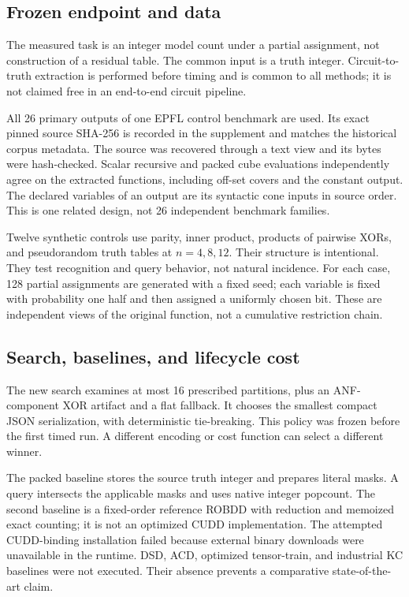 \documentclass[11pt]{article}
\theoremstyle{definition}\newtheorem{definition}[theorem]{Definition}
\theoremstyle{remark}\newtheorem{remark}[theorem]{Remark}
\begin{document}
\subsection{Frozen endpoint and data}
The measured task is an integer model count under a partial assignment, not construction of a residual table. The common input is a truth integer. Circuit-to-truth extraction is performed before timing and is common to all methods; it is not claimed free in an end-to-end circuit pipeline.

All 26 primary outputs of one EPFL control benchmark are used\cite{epfl}. Its exact pinned source SHA-256 is recorded in the supplement and matches the historical corpus metadata. The source was recovered through a text view and its bytes were hash-checked. Scalar recursive and packed cube evaluations independently agree on the extracted functions, including off-set covers and the constant output. The declared variables of an output are its syntactic cone inputs in source order. This is one related design, not 26 independent benchmark families.

Twelve synthetic controls use parity, inner product, products of pairwise XORs, and pseudorandom truth tables at $n=4,8,12$. Their structure is intentional. They test recognition and query behavior, not natural incidence. For each case, 128 partial assignments are generated with a fixed seed; each variable is fixed with probability one half and then assigned a uniformly chosen bit. These are independent views of the original function, not a cumulative restriction chain.

\subsection{Search, baselines, and lifecycle cost}
The new search examines at most 16 prescribed partitions, plus an ANF-component XOR artifact and a flat fallback. It chooses the smallest compact JSON serialization, with deterministic tie-breaking. This policy was frozen before the first timed run. A different encoding or cost function can select a different winner.

The packed baseline stores the source truth integer and prepares literal masks. A query intersects the applicable masks and uses native integer popcount. The second baseline is a fixed-order reference ROBDD with reduction and memoized exact counting; it is not an optimized CUDD implementation. The attempted CUDD-binding installation failed because external binary downloads were unavailable in the runtime. DSD, ACD, optimized tensor-train, and industrial KC baselines were not executed. Their absence prevents a comparative state-of-the-art claim.
\end{document}
